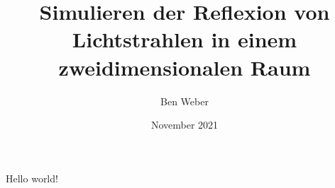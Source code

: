 \documentclass{article}
\title{Simulieren der Reflexion von Lichtstrahlen in einem zweidimensionalen Raum}
\author{Ben Weber}
\date{November 2021}
\begin{document}
   \maketitle
   Hello world!
\end{document}
